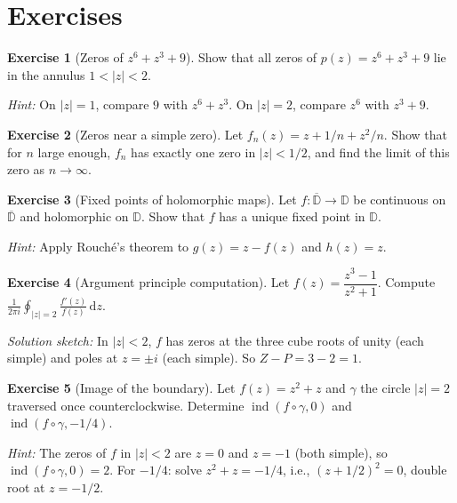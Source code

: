 \documentclass[12pt,a4paper,openany]{book}
\theoremstyle{definition}
\newtheorem{exercise}{Exercise}[chapter]
\theoremstyle{plain}
\theoremstyle{remark}
\newcommand{\D}{\mathbb{D}}
\DeclareMathOperator{\ind}{ind}
\newcommand{\dd}{\mathrm{d}}
\newcommand{\abs}[1]{\left|#1\right|}
\begin{document}
\section{Exercises}\label{sec:exercises-ch9}

\begin{exercise}[Zeros of $z^6 + z^3 + 9$]\label{exer:rouche-1}
Show that all zeros of $p(z) = z^6 + z^3 + 9$ lie in the annulus
$1 < \abs{z} < 2$.

\emph{Hint:} On $\abs{z}=1$, compare $9$ with $z^6+z^3$.
On $\abs{z}=2$, compare $z^6$ with $z^3+9$.
\end{exercise}

\begin{exercise}[Zeros near a simple zero]\label{exer:hurwitz-app}
Let $f_n(z) = z + 1/n + z^2/n$. Show that for $n$ large enough,
$f_n$ has exactly one zero in $\abs{z} < 1/2$, and find the limit
of this zero as $n \to \infty$.
\end{exercise}

\begin{exercise}[Fixed points of holomorphic maps]\label{exer:fixed-point}
Let $f\colon \overline{\D} \to \D$ be continuous on $\overline{\D}$
and holomorphic on $\D$. Show that $f$ has a unique fixed point in $\D$.

\emph{Hint:} Apply Rouch\'{e}'s theorem to $g(z) = z - f(z)$ and $h(z) = z$.
\end{exercise}

\begin{exercise}[Argument principle computation]\label{exer:argument-comp}
Let $f(z) = \dfrac{z^3 - 1}{z^2 + 1}$. Compute
$\displaystyle\frac{1}{2\pi i}\oint_{\abs{z}=2} \frac{f'(z)}{f(z)}\,\dd z$.

\emph{Solution sketch:} In $\abs{z}<2$, $f$ has zeros at the three cube roots
of unity (each simple) and poles at $z=\pm i$ (each simple). So
$Z - P = 3 - 2 = 1$.
\end{exercise}

\begin{exercise}[Image of the boundary]\label{exer:image-boundary}
Let $f(z) = z^2 + z$ and $\gamma$ the circle $\abs{z} = 2$ traversed
once counterclockwise. Determine $\ind(f \circ \gamma, 0)$ and
$\ind(f \circ \gamma, -1/4)$.

\emph{Hint:} The zeros of $f$ in $\abs{z}<2$ are $z=0$ and $z=-1$ (both simple),
so $\ind(f\circ\gamma,0) = 2$. For $-1/4$: solve $z^2+z = -1/4$,
i.e., $(z+1/2)^2 = 0$, double root at $z=-1/2$.
\end{exercise}
\end{document}
